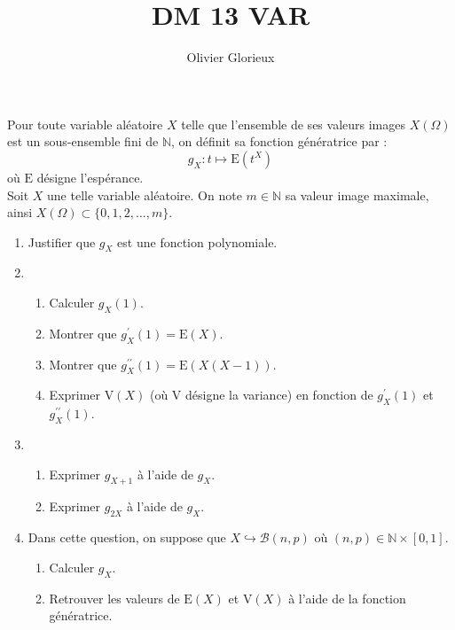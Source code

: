 \documentclass[a4paper, 11pt,reqno]{article}
\author{Olivier Glorieux}
\begin{document}
\title{DM 13 VAR }


\begin{exercice}%
Pour toute variable aléatoire $X$ telle que l'ensemble de ses valeurs images $X(\Omega)$ est un sous-ensemble fini de $\mathbb{N}$, on définit sa fonction génératrice par :
$$g_{X}: t \mapsto \mathrm{E}\left(t^{X}\right) $$ où $\mathrm{E}$ désigne l'espérance.\\
Soit $X$ une telle variable aléatoire. On note $m \in \mathbb{N}$ sa valeur image maximale, ainsi $X(\Omega) \subset\{0,1,2, \ldots, m\}$.

\begin{enumerate}
  \item Justifier que $g_{X}$ est une fonction polynomiale.
  \item 
 \begin{enumerate}
\item   Calculer $g_{X}(1)$.
\item Montrer que $g_{X}^{\prime}(1)=\mathrm{E}(X)$.
\item  Montrer que $g_{X}^{\prime \prime}(1)=\mathrm{E}(X(X-1))$.
\item  Exprimer $\mathrm{V}(X)$ (où $\mathrm{V}$ désigne la variance) en fonction de $g_{X}^{\prime}(1)$ et $g_{X}^{\prime \prime}(1)$. 
\end{enumerate}  

  \item
  
 \begin{enumerate}
  \item  Exprimer $g_{X+1}$ à l'aide de $g_{X}$.
\item  Exprimer $g_{2 X}$ à l'aide de $g_{X}$.
\end{enumerate}  
  \item Dans cette question, on suppose que $X \hookrightarrow \mathcal{B}(n, p)$ où $(n, p) \in \mathbb{N} \times[0,1]$.
  
  \begin{enumerate}
\item  Calculer $g_{X}$.
\item  Retrouver les valeurs de $\mathrm{E}(X)$ et $\mathrm{V}(X)$ à l'aide de la fonction   génératrice.
  \end{enumerate}

\end{enumerate}
\end{exercice}
\end{document}

